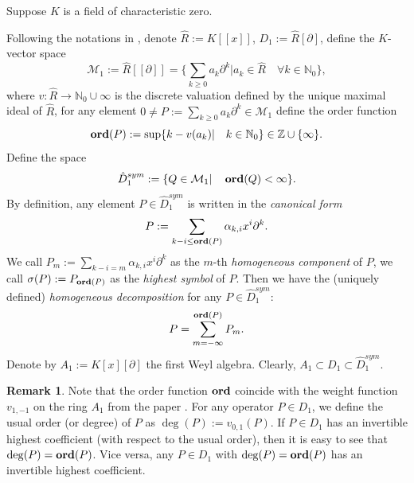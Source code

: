 \documentclass[11pt]{article}
\theoremstyle{definition}
\newcommand{\Ord}{\mathop {\rm \bf ord}}
\newtheorem{rem}{Remark}[section]
\theoremstyle{plain}
\numberwithin{equation}{section}
\begin{document}
Suppose $K$ is a field of characteristic zero. 

Following the notations in \cite{A.Z}, denote $\hat{R}:=K[[x]]$, $D_1:=\hat{R}[\partial ]$, define the $K$-vector space
$$
\mathcal{M}_{1}:=\hat{R}[[\partial]]=\{\sum_{k\ge 0}a_{k}\partial^{k}|a_{k}\in \hat{R}\quad  \forall k \in \mathbb{N}_{0}\} ,
$$
where $v:\hat{R}\rightarrow \mathbb{N}_0 \cup \infty$ is the discrete valuation defined by the unique maximal ideal of $\hat{R}$, for any element $0\neq P:=\sum_{k \ge 0}a_{k}\partial^{k}\in \mathcal{M}_{1}$ define the order function 
$$
\Ord(P):=\sup\{k-v(a_{k})|\quad k\in \mathbb{N}_{0}\}\in \mathbb{Z}\cup \{\infty\}.
$$
Define the space
$$
\hat{D}^{sym}_{1}:=\{Q\in\mathcal{M}_1|\quad \Ord(Q)<\infty \} .
$$
By definition, any element $P\in \hat{D}^{sym}_{1}$ is written in the {\it canonical form} 
$$
P:=\sum_{k-i\le \Ord (P)}\alpha_{k,i}x^{i}\partial^{k}.
$$ 
We call $P_{m}:=\sum_{k-i=m}\alpha_{k,i}x^{i}\partial^{k}$ as the $m$-th {\it homogeneous component} of $P$, we call $\sigma(P):=P_{\Ord(P)}$ as the {\it highest symbol} of $P$. Then we have the (uniquely defined) {\it homogeneous decomposition} for any $P\in \hat{D}^{sym}_{1}$:
$$
P=\sum_{m=-\infty }^{\Ord(P) }P_{m}. 
$$
Denote by $A_1:=K[x][\partial ]$ the first Weyl algebra. Clearly, $A_1\subset D_1 \subset \hat{D}_1^{sym}$. 

\begin{rem}
\label{R:ord=deg}
	Note that the order function $\Ord$ coincide with the weight function $v_{1,-1}$ on the ring $A_1$ from the paper \cite{Dixmier}.  For any operator $P \in D_1$, we define the usual order (or degree) of  $P$  as $\deg (P):=v_{0,1}(P)$. If $P\in D_1$ has an invertible highest coefficient (with respect to the usual order), then it is easy to see that  $\deg (P)=\Ord (P)$. Vice versa, any $P\in D_1$  with $\deg (P)=\Ord (P)$ has an invertible highest coefficient.
\end{rem}
\end{document}
